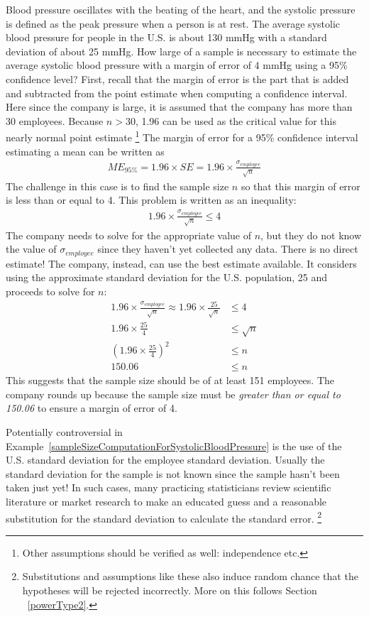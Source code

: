 \begin{example}{Blood pressure oscillates with the beating of the heart, and the systolic pressure is defined as the peak pressure when a person is at rest. The average systolic blood pressure for people in the U.S. is about 130 mmHg with a standard deviation of about 25 mmHg. How large of a sample is necessary to estimate the average systolic blood pressure with a margin of error of 4 mmHg using a 95\% confidence level?}
\label{sampleSizeComputationForSystolicBloodPressure}
First, recall that the margin of error is the part that is added and subtracted from the point estimate when computing a confidence interval. Here since the company is large, it is assumed that the company has more than 30 employees. Because $n>30$,  1.96 can be used as the critical value for this nearly normal point estimate \footnote{Other assumptions should be verified as well: independence etc.} The margin of error for a 95\% confidence interval estimating a mean can be written as
\begin{align*}
ME_{95\%} = 1.96\times SE = 1.96\times\frac{\sigma_{employee}}{\sqrt{n}}
\end{align*}
The challenge in this case is to find the sample size $n$ so that this margin of error is less than or equal to 4. This problem is written as an inequality:
\begin{align*}
1.96\times \frac{\sigma_{employee}}{\sqrt{n}} \leq 4
\end{align*}
The company needs to solve for the appropriate value of $n$, but they do not know the value of $\sigma_{employee}$ since they haven't yet collected any data. There is no direct estimate! The company, instead, can use the best estimate available. It considers using the approximate standard deviation for the U.S. population, 25 and proceeds to solve for $n$:
\begin{align*}
1.96\times \frac{\sigma_{employee}}{\sqrt{n}} \approx 1.96\times\frac{25}{\sqrt{n}}
	&\leq 4 \\
1.96\times\frac{25}{4} &\leq \sqrt{n} \\
\left(1.96\times\frac{25}{4}\right)^2 &\leq n \\
150.06 &\leq n
\end{align*}
This suggests that the sample size should be of at least 151 employees. The company rounds up because the sample size must be \emph{greater than or equal to 150.06} to ensure a margin of error of 4.
\end{example}

Potentially controversial in Example~\ref{sampleSizeComputationForSystolicBloodPressure} is the use of the U.S. standard deviation for the employee standard deviation. Usually the standard deviation for the sample is not known since the sample hasn't been taken just yet! In such cases, many practicing statisticians review scientific literature or market research to make an educated guess and a reasonable substitution for the standard deviation to calculate the standard error. \footnote{Substitutions and assumptions like these also induce random chance that the hypotheses will be rejected incorrectly. More on this follows Section ~\ref{powerType2}.}

